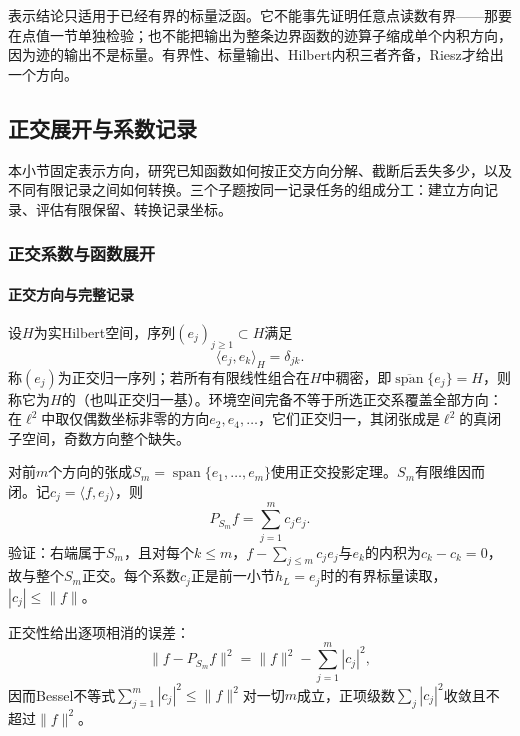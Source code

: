 表示结论只适用于已经有界的标量泛函。它不能事先证明任意点读数有界——那要在点值一节单独检验；也不能把输出为整条边界函数的迹算子缩成单个内积方向，因为迹的输出不是标量。有界性、标量输出、Hilbert内积三者齐备，Riesz才给出一个方向。

\subsection{正交展开与系数记录}
\label{subsec:orthogonal-expansions-coefficients}

本小节固定表示方向，研究已知函数如何按正交方向分解、截断后丢失多少，以及不同有限记录之间如何转换。三个子题按同一记录任务的组成分工：建立方向记录、评估有限保留、转换记录坐标。

\subsubsection{正交系数与函数展开}
\label{subsubsec:orthogonal-records}

\paragraph{正交方向与完整记录}

设$H$为实Hilbert空间，序列$(e_j)_{j\ge1}\subset H$满足
\[
\langle e_j,e_k\rangle_H=\delta_{jk}.
\]
称$(e_j)$为正交归一序列；若所有有限线性组合在$H$中稠密，即$\overline{\operatorname{span}}\{e_j\}=H$，则称它为$H$的（也叫正交归一基）。环境空间完备不等于所选正交系覆盖全部方向：在$\ell^2$中取仅偶数坐标非零的方向$e_2,e_4,\dots$，它们正交归一，其闭张成是$\ell^2$的真闭子空间，奇数方向整个缺失。

对前$m$个方向的张成$S_m=\operatorname{span}\{e_1,\dots,e_m\}$使用正交投影定理。$S_m$有限维因而闭。记$c_j=\langle f,e_j\rangle$，则
\begin{equation}
\label{eq:functional-orthogonal-partial-projection}
P_{S_m}f=\sum_{j=1}^m c_j e_j.
\end{equation}
验证：右端属于$S_m$，且对每个$k\le m$，$f-\sum_{j\le m}c_je_j$与$e_k$的内积为$c_k-c_k=0$，故与整个$S_m$正交。每个系数$c_j$正是前一小节$h_L=e_j$时的有界标量读取，$|c_j|\le\|f\|$。

正交性给出逐项相消的误差：
\begin{equation}
\label{eq:functional-bessel}
\|f-P_{S_m}f\|^2=\|f\|^2-\sum_{j=1}^m|c_j|^2,
\end{equation}
因而Bessel不等式$\sum_{j=1}^m|c_j|^2\le\|f\|^2$对一切$m$成立，正项级数$\sum_j|c_j|^2$收敛且不超过$\|f\|^2$。

